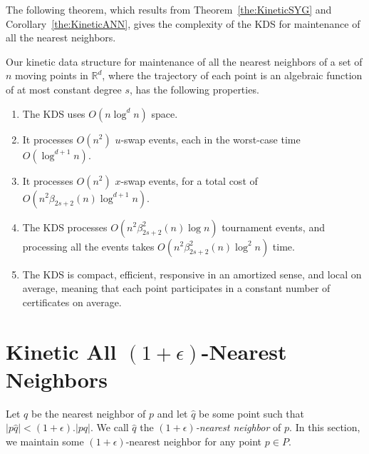\documentclass[11pt]{llncs}
\begin{document}
The following theorem, which results from Theorem~\ref{the:KineticSYG} and Corollary~\ref{the:KineticANN}, gives the complexity of the KDS for maintenance of all the nearest neighbors.
\begin{theorem}\label{the:KineticAllNN}
Our kinetic data structure for maintenance of all the nearest neighbors of a set of $n$ moving points in $\mathbb{R}^d$, where the trajectory of each point is an algebraic function of at most constant degree $s$, has the following properties. 
\begin{enumerate}
\item The KDS uses $O(n\log^d n)$ space.
\item It processes $O(n^2)$ $u$-swap events, each in the worst-case time $O(\log^{d+1} n)$.
\item It processes $O(n^2)$ $x$-swap events, for a total cost of $O(n^2\beta_{2s+2}(n)\log^{d+1} n)$.
\item The KDS processes $O(n^2\beta_{2s+2}^2(n)\log n)$ tournament events, and processing all the events takes $O(n^2\beta_{2s+2}^2(n)\log^2 n)$ time.
\item The KDS is compact, efficient, responsive in an amortized sense, and local on average, meaning that each point participates in a constant number of certificates on average.
\end{enumerate}
\end{theorem}
\section{Kinetic All $(1+\epsilon)$-Nearest Neighbors}\label{sec:KineticEpsANN}
Let $q$ be the nearest neighbor of $p$ and let $\hat{q}$ be some point such that $|p\hat{q}|<(1+\epsilon).|pq|$. We call $\hat{q}$ the \textit{$(1+\epsilon)$-nearest neighbor} of $p$. In this section,  we maintain some $(1+\epsilon)$-nearest neighbor for any point $p\in P$.
\end{document}
